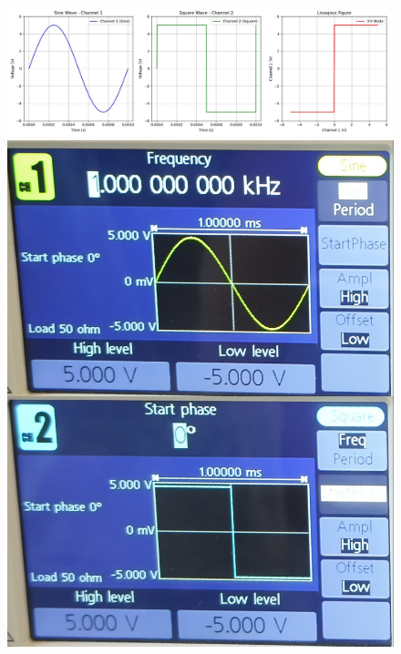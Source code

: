 \documentclass[12pt,a4paper]{report}
\begin{document}
\begin{figure}[H] %
    \centering
    \includegraphics[width=\textwidth]{figs/6.jpg} %
    \begin{minipage}[c]{0.48\textwidth}
        \includegraphics[width=\textwidth]{figs/6read.jpg} %
        

\end{minipage}
\end{figure}
\end{document}
